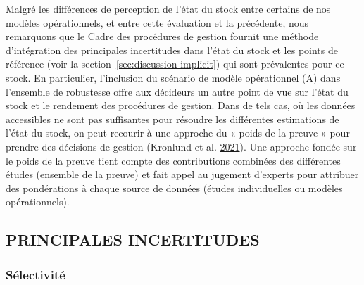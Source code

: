 \documentclass[french,11pt]{book}
\begin{document}
Malgré les différences de perception de l'état du stock entre certains de nos modèles opérationnels, et entre cette évaluation et la précédente, nous remarquons que le Cadre des procédures de gestion fournit une méthode d'intégration des principales incertitudes dans l'état du stock et les points de référence (voir la section~\ref{sec:discussion-implicit}) qui sont prévalentes pour ce stock. En particulier, l'inclusion du scénario de modèle opérationnel (A) dans l'ensemble de robustesse offre aux décideurs un autre point de vue sur l'état du stock et le rendement des procédures de gestion. Dans de tels cas, où les données accessibles ne sont pas suffisantes pour résoudre les différentes estimations de l'état du stock, on peut recourir à une approche du « poids de la preuve » pour prendre des décisions de gestion (Kronlund et al. \protect\hyperlink{ref-kronlund2020}{2021}). Une approche fondée sur le poids de la preuve tient compte des contributions combinées des différentes études (ensemble de la preuve) et fait appel au jugement d'experts pour attribuer des pondérations à chaque source de données (études individuelles ou modèles opérationnels).

\hypertarget{sec:discussion-uncertainties}{%
\subsection{PRINCIPALES INCERTITUDES}\label{sec:discussion-uncertainties}}

\hypertarget{sec:discussion-uncertainties-selectivity}{%
\subsubsection{Sélectivité}\label{sec:discussion-uncertainties-selectivity}}
\end{document}
